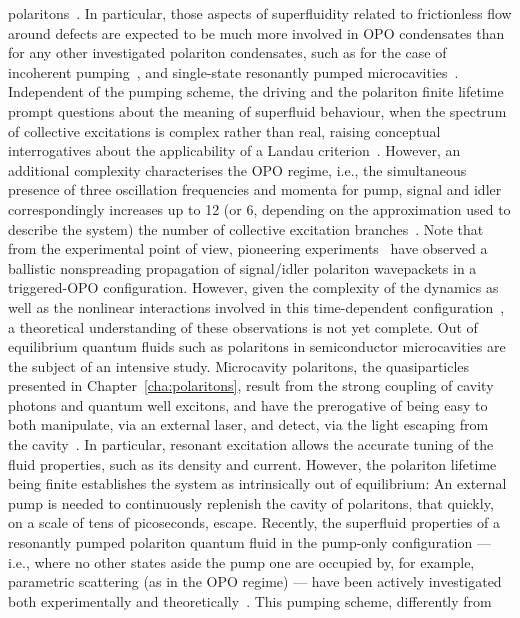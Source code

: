 polaritons~\cite{Carusotto_2013}.  In particular, those aspects of
superfluidity related to frictionless flow around defects are expected
to be much more involved in OPO condensates than for any other
investigated polariton condensates, such as for the case of incoherent
pumping~\cite{Kasprzak_2006,Wouters_2010}, and single-state resonantly
pumped microcavities~\cite{Amo_2009}.  Independent of the pumping
scheme, the driving and the polariton finite lifetime prompt questions
about the meaning of superfluid behaviour, when the spectrum of
collective excitations is complex rather than real, raising conceptual
interrogatives about the applicability of a Landau
criterion~\cite{Wouters_2010}.  However, an additional complexity
characterises the OPO regime, i.e., the simultaneous presence of three
oscillation frequencies and momenta for pump, signal and idler
correspondingly increases up to 12 (or 6, depending on the
approximation used to describe the system) the number of collective
excitation branches~\cite{Wouters_2007}. Note that from the
experimental point of view, pioneering experiments~\cite{Amo_2009_b}
have observed a ballistic nonspreading propagation of signal/idler
polariton wavepackets in a triggered-OPO configuration.  However,
given the complexity of the dynamics as well as the nonlinear
interactions involved in this time-dependent
configuration~\cite{Szyma_ska_2010}, a theoretical understanding of
these observations is not yet complete.
%
Out of equilibrium quantum fluids such as polaritons in semiconductor
microcavities are the subject of an intensive study. Microcavity
polaritons, the quasiparticles presented in
Chapter~\ref{cha:polaritons}, result from the strong coupling of
cavity photons and quantum well excitons, and have the prerogative of
being easy to both manipulate, via an external laser, and detect, via
the light escaping from the cavity~\cite{9780199228942}. In
particular, resonant excitation allows the accurate tuning of the
fluid properties, such as its density and current. However, the
polariton lifetime being finite establishes the system as
intrinsically out of equilibrium: An external pump is needed to
continuously replenish the cavity of polaritons, that quickly, on a
scale of tens of picoseconds, escape.
%
Recently, the superfluid properties of a resonantly pumped polariton
quantum fluid in the pump-only configuration --- i.e., where no other
states aside the pump one are occupied by, for example, parametric
scattering (as in the OPO regime) --- have been actively investigated
both experimentally and theoretically~\cite{Carusotto_2004,
  Ciuti_2005, Amo_2009, Cancellieri_2010, Pigeon_2011, Amo_2011,
  Nardin_2011, Sanvitto_2011}. This pumping scheme, differently from
